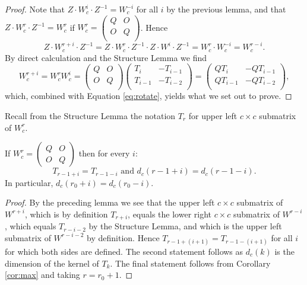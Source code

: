 \begin{proof}
Note that $Z\cdot W_c^{i}\cdot Z^{-1}=W_c^{-i}$ for all $i$
by the previous lemma, and that
$Z\cdot W_c^r\cdot Z^{-1}=W_c^r$ if $W_c^r=
  \left(\begin{matrix} Q & O \\ O & Q \\\end{matrix}\right)$.
  Hence
  \[Z\cdot W_{c}^{r+i}\cdot Z^{-1}=Z\cdot W_{c}^{r}\cdot Z^{-1}\cdot Z\cdot W^{i}\cdot Z^{-1}=W_{c}^{r}\cdot W_{c}^{-i}=W_{c}^{r-i}.\]
  By direct calculation and the Structure Lemma we find
  \[
 W_{c}^{r+i}
 =
  W_{c}^{r}W_{c}^{i}
  =
  \left(
\begin{matrix}
    Q & O \\
    O & Q \\
  \end{matrix}
  \right)
  \left(
  \begin{matrix}
     T_{i} &  -T_{i-1}  \\
    T_{i-1} & -T_{i-2} \\
  \end{matrix}
  \right)
  =
  \left(
  \begin{matrix}
     QT_{i} &  -QT_{i-1}  \\
    QT_{i-1} & -QT_{i-2} \\
  \end{matrix}
  \right),
  \]
  which, combined with Equation \ref{eq:rotate}, yields what we set out to prove.
\end{proof}
Recall from the Structure Lemma the notation $T_r$ for upper left $c\times c$
submatrix of $W_c^r$.
\begin{corollary}\label{cor:palin} 
If $W_c^r=\left(\begin{matrix}Q&O\\O&Q\end{matrix}\right)$ then for every $i$:
	$$T_{r-1+i}=T_{r-1-i} \textrm{\ \ and\ \ }
d_c(r-1+i)=d_c(r-1-i).$$ In particular, $d_c(r_0+i)=d_c(r_0-i)$.
\end{corollary}
\begin{proof}
	By the preceding lemma we see that the upper left $c\times c$
	submatrix of $W^{r+i}$, which is by definition $T_{r+i}$, equals
	the lower right  $c\times c$ submatrix of $W^{r-i}$, which
	equals $T_{r-i-2}$ by the Structure Lemma, and which is the upper
	left submatrix of $W^{r-i-2}$ by definition. Hence 
	$T_{r-1+(i+1)}=T_{r-1-(i+1)}$ for all $i$ for which both 
	sides are defined. The second statement follows as $d_c(k)$
	is the dimension of the kernel of $T_k$. 
	The final statement follows from Corollary \ref{cor:max} and taking $r=r_0+1$.
\end{proof}

